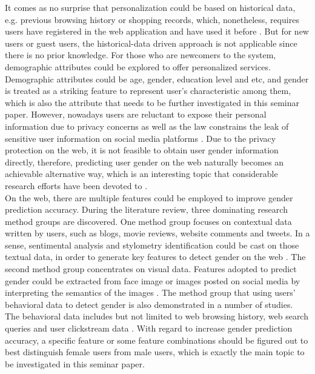 \documentclass[runningheads]{llncs}
\begin{document}
	It comes as no surprise that personalization could be based on historical data, e.g. previous browsing history or shopping records, which, nonetheless, requires users have registered in the web application and have used it before \cite{duong2016customer}. But for new users or guest users, the historical-data driven approach is not applicable since there is no prior knowledge. For those who are newcomers to the system, demographic attributes could be explored to offer personalized services. Demographic attributes could be age, gender, education level and etc, and gender is treated as a striking feature to represent user’s characteristic among them, which is also the attribute that needs to be further investigated in this seminar paper. However, nowadays users are reluctant to expose their personal information due to privacy concerns as well as the law constrains the leak of sensitive user information on social media platforms \cite{zheleva2009join}. Due to the privacy protection on the web, it is not feasible to obtain user gender information directly, therefore, predicting user gender on the web naturally becomes an achievable alternative way, which is an interesting topic that considerable research efforts have been devoted to \cite{phuong2014gender}. \\
	
	On the web, there are multiple features could be employed to improve gender prediction accuracy. During the literature review, three dominating research method groups are discovered. One method group focuses on contextual data written by users, such as blogs, movie reviews, website comments and tweets.  In a sense, sentimental analysis and stylometry identification could be cast on those textual data, in order to generate key features to detect gender on the web \cite{phuong2014gender}. The second method group concentrates on visual data. Features adopted to predict gender could be extracted from face image or images posted on social media by interpreting the semantics of the images \cite{merler2015you}. The method group that using users’ behavioral data to detect gender is also demonstrated in a number of studies. The behavioral data includes but not limited to web browsing history, web search queries and user clickstream data \cite{hu2007demographic}. With regard to increase gender prediction accuracy, a specific feature or some feature combinations should be figured out to best distinguish female users from male users, which is exactly the main topic to be investigated in this seminar paper. \\
	
\end{document}
